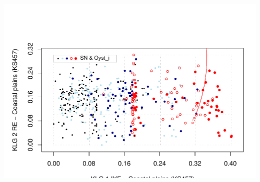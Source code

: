 \documentclass[]{article}
\begin{document}
\includegraphics{Landscape_analysis_example_4_files/figure-latex/unnamed-chunk-42-1.pdf}
\end{document}

